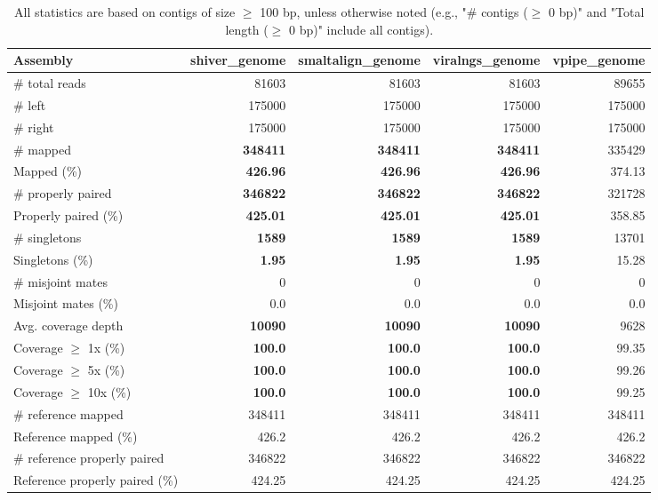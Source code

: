 \documentclass[12pt,a4paper]{article}
\begin{document}
\begin{table}[ht]
\begin{center}
\caption{All statistics are based on contigs of size $\geq$ 100 bp, unless otherwise noted (e.g., "\# contigs ($\geq$ 0 bp)" and "Total length ($\geq$ 0 bp)" include all contigs).}
\begin{tabular}{|l*{4}{|r}|}
\hline
Assembly & shiver\_genome & smaltalign\_genome & viralngs\_genome & vpipe\_genome \\ \hline
\# total reads & 81603 & 81603 & 81603 & 89655 \\ \hline
\# left & 175000 & 175000 & 175000 & 175000 \\ \hline
\# right & 175000 & 175000 & 175000 & 175000 \\ \hline
\# mapped & {\bf 348411} & {\bf 348411} & {\bf 348411} & 335429 \\ \hline
Mapped (\%) & {\bf 426.96} & {\bf 426.96} & {\bf 426.96} & 374.13 \\ \hline
\# properly paired & {\bf 346822} & {\bf 346822} & {\bf 346822} & 321728 \\ \hline
Properly paired (\%) & {\bf 425.01} & {\bf 425.01} & {\bf 425.01} & 358.85 \\ \hline
\# singletons & {\bf 1589} & {\bf 1589} & {\bf 1589} & 13701 \\ \hline
Singletons (\%) & {\bf 1.95} & {\bf 1.95} & {\bf 1.95} & 15.28 \\ \hline
\# misjoint mates & 0 & 0 & 0 & 0 \\ \hline
Misjoint mates (\%) & 0.0 & 0.0 & 0.0 & 0.0 \\ \hline
Avg. coverage depth & {\bf 10090} & {\bf 10090} & {\bf 10090} & 9628 \\ \hline
Coverage $\geq$ 1x (\%) & {\bf 100.0} & {\bf 100.0} & {\bf 100.0} & 99.35 \\ \hline
Coverage $\geq$ 5x (\%) & {\bf 100.0} & {\bf 100.0} & {\bf 100.0} & 99.26 \\ \hline
Coverage $\geq$ 10x (\%) & {\bf 100.0} & {\bf 100.0} & {\bf 100.0} & 99.25 \\ \hline
\# reference mapped & 348411 & 348411 & 348411 & 348411 \\ \hline
Reference mapped (\%) & 426.2 & 426.2 & 426.2 & 426.2 \\ \hline
\# reference properly paired & 346822 & 346822 & 346822 & 346822 \\ \hline
Reference properly paired (\%) & 424.25 & 424.25 & 424.25 & 424.25 \\ \hline

\end{tabular}
\end{center}
\end{table}
\end{document}
